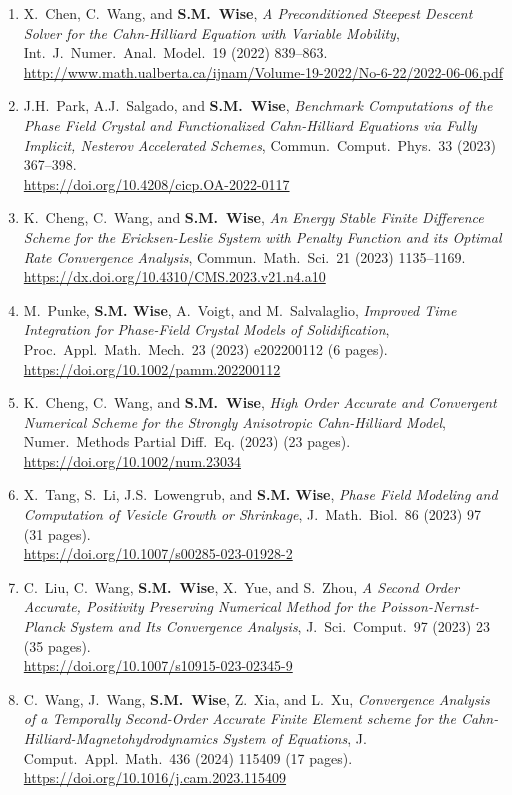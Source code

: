 \documentclass[11pt]{letter}
\begin{document}
\begin{enumerate}
	\item
X.~Chen, C.~Wang, and \textbf{S.M.~Wise}, {\sl A Preconditioned Steepest Descent Solver for the Cahn-Hilliard Equation with Variable Mobility}, Int.~J.~Numer.~Anal.~Model.~19 (2022) 839--863.
	\\
\url{http://www.math.ualberta.ca/ijnam/Volume-19-2022/No-6-22/2022-06-06.pdf}

	\item
J.H.~Park, A.J.~Salgado, and \textbf{S.M.~Wise}, {\sl Benchmark Computations of the Phase Field Crystal and Functionalized Cahn-Hilliard Equations via Fully Implicit, Nesterov Accelerated Schemes}, Commun.~Comput.~Phys.~33 (2023) 367--398.
	\\
\url{https://doi.org/10.4208/cicp.OA-2022-0117}

	\item
K.~Cheng, C.~Wang, and \textbf{S.M.~Wise}, {\sl An Energy Stable Finite Difference Scheme for the Ericksen-Leslie System with Penalty Function and its Optimal Rate Convergence Analysis}, Commun.~Math.~Sci.~21 (2023)  1135--1169.
	\\
\url{https://dx.doi.org/10.4310/CMS.2023.v21.n4.a10}

	\item
M.~Punke, \textbf{S.M. Wise}, A.~Voigt, and M.~Salvalaglio, {\sl Improved Time Integration for Phase-Field Crystal Models of Solidification}, Proc.~Appl.~Math.~Mech.~23 (2023) e202200112 (6 pages).
	\\
\url{https://doi.org/10.1002/pamm.202200112}

	\item
K.~Cheng, C.~Wang, and \textbf{S.M.~Wise}, {\sl High Order Accurate and Convergent Numerical Scheme for the Strongly Anisotropic Cahn-Hilliard Model}, Numer.~Methods Partial Diff.~Eq. (2023) (23 pages).
	\\
\url{https://doi.org/10.1002/num.23034}

	\item
X.~Tang, S.~Li, J.S.~Lowengrub, and \textbf{S.M. Wise}, {\sl Phase Field Modeling and Computation of Vesicle Growth or Shrinkage}, J.~Math.~Biol.~86 (2023) 97 (31 pages).
	\\
\url{https://doi.org/10.1007/s00285-023-01928-2}

	\item
C.~Liu, C.~Wang, \textbf{S.M.~Wise}, X.~Yue, and S.~Zhou, {\sl A Second Order Accurate, Positivity Preserving Numerical Method for the Poisson-Nernst-Planck System and Its Convergence Analysis}, J.~Sci.~Comput.~97 (2023) 23 (35 pages).
	\\
\url{https://doi.org/10.1007/s10915-023-02345-9}	
	\item
C.~Wang, J.~Wang, \textbf{S.M.~Wise}, Z.~Xia, and L.~Xu, {\sl Convergence Analysis of a Temporally Second-Order Accurate Finite Element scheme for the Cahn-Hilliard-Magnetohydrodynamics System of Equations}, J. Comput.~Appl.~Math.~436 (2024) 115409 (17 pages).
	\\
\url{https://doi.org/10.1016/j.cam.2023.115409}


\end{enumerate}
\end{document}

